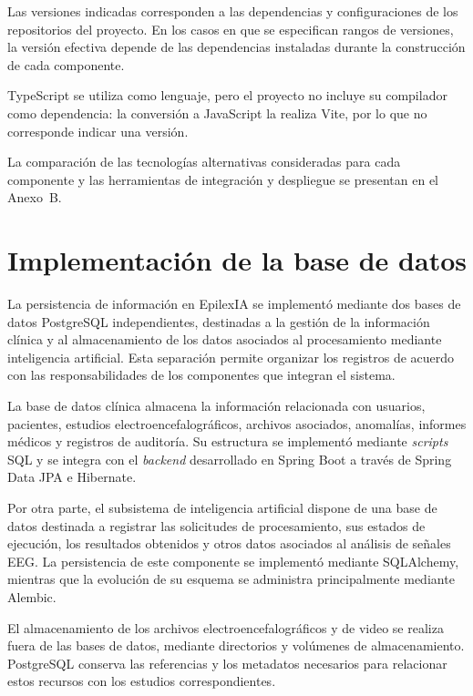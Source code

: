 Las versiones indicadas corresponden a las dependencias y
configuraciones de los repositorios del proyecto.
En los casos en que se especifican rangos de versiones, la
versión efectiva depende de las dependencias instaladas durante
la construcción de cada componente. 
\begin{nuevotextodos}
TypeScript se utiliza como lenguaje, pero el proyecto no incluye su compilador como dependencia: la conversión a JavaScript la realiza Vite, por lo que no corresponde indicar una versión.
\end{nuevotextodos}

\begin{nuevotexto}
La comparación de las tecnologías alternativas consideradas para cada componente y las herramientas de integración y despliegue se presentan en el Anexo~B.
\end{nuevotexto}

\section{Implementación de la base de datos}

La persistencia de información en EpilexIA se implementó mediante
dos bases de datos PostgreSQL independientes, destinadas a la
gestión de la información clínica y al almacenamiento de los
datos asociados al procesamiento mediante inteligencia
artificial. Esta separación permite organizar los registros
de acuerdo con las responsabilidades de los componentes que
integran el sistema.

La base de datos clínica almacena la información relacionada
con usuarios, pacientes, estudios electroencefalográficos,
archivos asociados, anomalías, informes médicos y registros
de auditoría. Su estructura se implementó mediante \textit{scripts}
SQL y se integra con el \textit{backend} desarrollado en Spring Boot
a través de Spring Data JPA e Hibernate.

Por otra parte, el subsistema de inteligencia artificial
dispone de una base de datos destinada a registrar las
solicitudes de procesamiento, sus estados de ejecución,
los resultados obtenidos y otros datos asociados al análisis
de señales EEG. La persistencia de este componente se
implementó mediante SQLAlchemy, mientras que la evolución
de su esquema se administra principalmente mediante Alembic.

El almacenamiento de los archivos electroencefalográficos
y de video se realiza fuera de las bases de datos, mediante
directorios y volúmenes de almacenamiento. PostgreSQL conserva
las referencias y los metadatos necesarios para relacionar
estos recursos con los estudios correspondientes.

